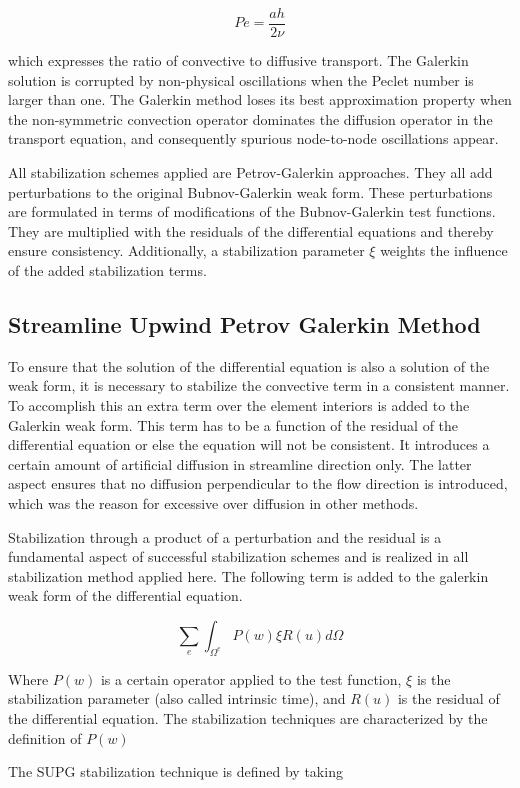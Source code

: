$$Pe=\frac{ah}{2\nu}$$

 which expresses the ratio of convective to diffusive transport.
The  Galerkin solution is corrupted by non-physical oscillations when the Peclet number is larger than one. The Galerkin method loses its best approximation property when the non-symmetric convection operator dominates the diffusion operator in the transport equation, and consequently spurious node-to-node oscillations appear.

 All stabilization schemes applied are Petrov-Galerkin approaches. They all add perturbations to the original Bubnov-Galerkin weak form. These perturbations are formulated in terms of modifications of the Bubnov-Galerkin test functions. They are multiplied with the residuals of the differential equations and thereby ensure consistency. Additionally, a stabilization parameter $\xi$ weights the influence of the added stabilization terms.

\subsection{Streamline Upwind Petrov Galerkin Method}
To ensure that the solution of the differential equation is also a solution of the
weak form, it is necessary to stabilize the convective term in a consistent manner. To accomplish this an extra term over the element interiors is added
to the Galerkin weak form. This term has to be a function of the residual of the differential equation or else the equation will not be consistent. It introduces a certain amount of artificial diffusion in streamline direction only. The latter aspect ensures that no diffusion perpendicular to the flow direction is introduced, which was the reason for excessive over diffusion in other methods. 

\bigskip
 Stabilization through a product of a perturbation and the residual
is a fundamental aspect of successful stabilization schemes and is realized in all stabilization method
applied here. The following term is added to the galerkin weak form of the differential equation. 

 $$\sum_e \int_{\Omega^e} P(w) \xi R(u)  d\Omega$$ 


\bigskip
 Where $P(w)$ is a certain operator applied to the test function, $\xi$ is the stabilization
parameter (also called intrinsic time), and $R(u)$ is the residual of the differential
equation. The stabilization techniques are characterized by the definition of $P(w)$

\bigskip
 The SUPG stabilization technique is defined by taking


